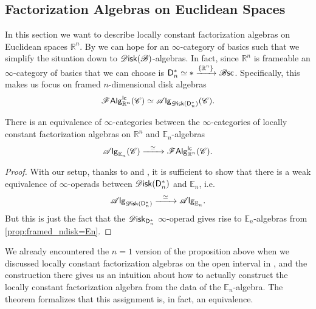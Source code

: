 \documentclass[../text]{subfiles}
\begin{document}
\subsection{Factorization Algebras on Euclidean Spaces}\label{ssec:lcfa_on_Rn}

In this section we want to describe locally constant factorization algebras on Euclidean spaces $\mathbb{R}^n$. By  we can hope for an $\infty$-category of basics such that we simplify the situation down to $\disk (\bstr)$-algebras. In fact, since $\mathbb{R}^n$ is frameable an $\infty$-category of basics that we can choose is $\mathsf{D}_n^* \simeq * \xrightarrow{\{ \mathbb{R}^n\}} \mathscr{B} \mathsf{sc}$. Specifically, this makes us focus on framed $n$-dimensional disk algebras
%
\begin{equation}
    \lcfa_{\mathbb{R}^n} (\catC) \simeq \alg{\disk (\mathsf{D}_n^*)} (\catC).
\end{equation}
%

\begin{theorem}
    There is an equivalence of $\infty$-categories between the $\infty$-categories of locally constant factorization algebras on $\mathbb{R}^n$ and $\mathbb{E}_n$-algebras
    \begin{equation}
        \alg{\mathbb{E}_n} (\catC) \xrightarrow{\ \ \simeq \ \ } \lcfa_{\mathbb{R}^n} (\catC).
    \end{equation}
\end{theorem}

\begin{proof}
    With our setup, thanks to  and , it is sufficient to show that there is a weak equivalence of $\infty$-operads between $\disk (\mathsf{D}_n^*)$ and $\mathbb{E}_n$, i.e.
    \begin{equation}
        \alg{\disk (\mathsf{D}_n^*)} \xrightarrow{\ \ \simeq \ \ } \alg{\mathbb{E}_n}.
    \end{equation}
    But this is just the fact that the $\disk_{\mathsf{D}_n^*}$ $\infty$-operad gives rise to $\mathbb{E}_n$-algebras from \cref{prop:framed_ndisk=En}.
\end{proof}

\begin{remark}
    We already encountered the $n=1$ version of the proposition above when we discussed locally constant factorization algebras on the open interval in , and the construction there gives us an intuition about how to actually construct the locally constant factorization algebra from the data of the $\mathbb{E}_n$-algebra. The theorem formalizes that this assignment is, in fact, an equivalence.
\end{remark}
\end{document}
